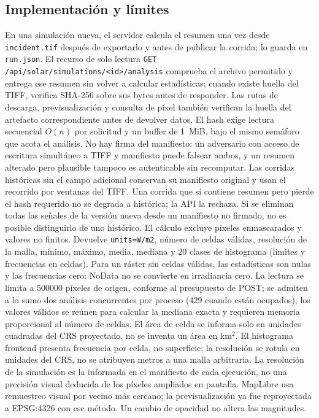 \documentclass[11pt,a4paper]{article}
\begin{document}
\subsection{Implementación y límites}
En una simulación nueva, el servidor calcula el resumen una vez desde \texttt{incident.tif} después de exportarlo y antes de publicar la corrida; lo guarda en \texttt{run.json}. El recurso de solo lectura \texttt{GET /api/solar/simulations/<id>/analysis} comprueba el archivo permitido y entrega ese resumen sin volver a calcular estadísticas; cuando existe huella del TIFF, verifica SHA-256 sobre sus bytes antes de responder. Las rutas de descarga, previsualización y consulta de píxel también verifican la huella del artefacto correspondiente antes de devolver datos. El hash exige lectura secuencial $O(n)$ por solicitud y un buffer de 1~MiB, bajo el mismo semáforo que acota el análisis. No hay firma del manifiesto: un adversario con acceso de escritura simultáneo a TIFF y manifiesto puede falsear ambos, y un resumen alterado pero plausible tampoco es autenticable sin recomputar. Las corridas históricas sin el campo adicional conservan su manifiesto original y usan el recorrido por ventanas del TIFF. Una corrida que sí contiene resumen pero pierde el hash requerido no se degrada a histórica; la API la rechaza. Si se eliminan todas las señales de la versión nueva desde un manifiesto no firmado, no es posible distinguirlo de uno histórico. El cálculo excluye píxeles enmascarados y valores no finitos. Devuelve \texttt{units=W/m2}, número de celdas válidas, resolución de la malla, mínimo, máximo, media, mediana y 20 clases de histograma (límites y frecuencias en celdas). Para un ráster sin celdas válidas, las estadísticas son nulas y las frecuencias cero: NoData no se convierte en irradiancia cero. La lectura se limita a 500000 píxeles de origen, conforme al presupuesto de POST; se admiten a lo sumo dos análisis concurrentes por proceso (429 cuando están ocupados); los valores válidos se reúnen para calcular la mediana exacta y requieren memoria proporcional al número de celdas. El área de celda se informa solo en unidades cuadradas del CRS proyectado, no se inventa un área en km$^2$. El histograma frontend presenta frecuencia por celda, no superficie; la resolución se rotula en unidades del CRS, no se atribuyen metros a una malla arbitraria. La resolución de la simulación es la informada en el manifiesto de cada ejecución, no una precisión visual deducida de los píxeles ampliados en pantalla. MapLibre usa remuestreo visual por vecino más cercano; la previsualización ya fue reproyectada a EPSG:4326 con ese método. Un cambio de opacidad no altera las magnitudes.
\end{document}
